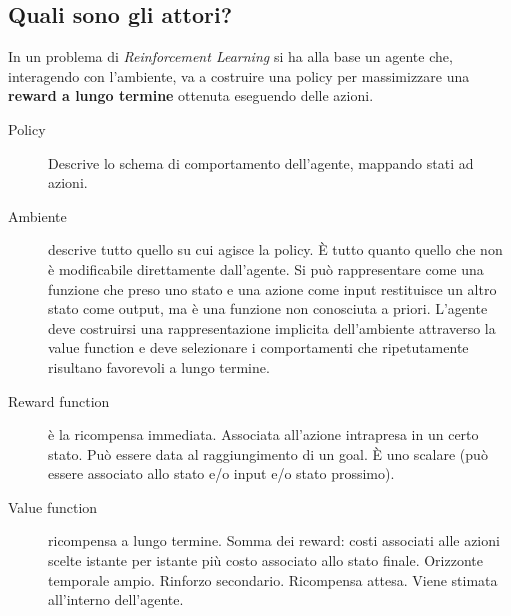 \documentclass[\main/main.tex]{subfiles}
\begin{document}
\subsection{Quali sono gli attori?}
In un problema di \textit{Reinforcement Learning} si ha alla base un agente che, interagendo con l'ambiente, va a costruire una policy per massimizzare una \textbf{reward a lungo termine} ottenuta eseguendo delle azioni.
\begin{description}
  \item [Policy] Descrive lo schema di comportamento dell'agente, mappando stati ad azioni.
  \item [Ambiente] descrive tutto quello su cui agisce la policy. È tutto quanto quello che non è modificabile direttamente dall'agente. Si può rappresentare come una funzione che preso uno stato e una azione come input restituisce un altro stato come output, ma è una funzione non conosciuta a priori. L'agente deve costruirsi una rappresentazione implicita dell'ambiente attraverso la value function e deve selezionare i comportamenti che ripetutamente risultano favorevoli a lungo termine.
  \item [Reward function] è la ricompensa immediata. Associata all'azione intrapresa in un certo stato. Può essere data al raggiungimento di un goal. È uno scalare (può essere associato allo stato e/o input e/o stato prossimo).
  \item [Value function] ricompensa a lungo termine. Somma dei reward: costi associati alle azioni scelte istante per istante più costo associato allo stato finale. Orizzonte temporale ampio. Rinforzo secondario. Ricompensa attesa. Viene stimata all'interno dell'agente.
\end{description}
\end{document}
